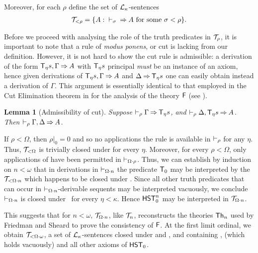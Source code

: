 \documentclass[UKenglish,cleveref,DIV=12]{scrartcl}
\newtheorem{lemma}{Lemma}[section]
\theoremstyle{definition}
\theoremstyle{definition}
\newcommand{\gelhighlight}[1]{\highlight[magenta]{#1}}
\begin{document}
Moreover, for each $\rho$ define the set of $\mathcal{L}_\kappa$-sentences
\begin{align*}
	\mathcal{T}_{<\rho}=\{ A:{}\vdash_\sigma  {} \mathbin\Rightarrow A\text{ for some $\sigma<\rho$}\}.
\end{align*}

Before we proceed with analysing the role of the truth predicates in
$\mathcal{T}_\rho$, it is important to note that a rule of \emph{modus ponens}, or cut
is lacking from our definition. However, it is not hard to show the cut rule is
admissible: a derivation of
the form $ \mathsf{T}_\eta s , \Gamma \mathbin\Rightarrow A $ with $ \mathsf{T}_\eta s$ principal \emph{must} be an
instance of an axiom, hence given derivations of $ \mathsf{T}_\eta s , \Gamma \mathbin\Rightarrow A $
and $\Delta \mathbin\Rightarrow \mathsf{T}_\eta s $ one can easily obtain instead a derivation of $\Gamma$.
This argument is essentially identical to that employed in the Cut Elimination
theorem in \cite{LeiRat10} for the analysis of the theory $\mathsf{F}$ (see \cite[Thm.~3.7]{LeiRat10}).
\begin{lemma}[Admissibility of cut]\label{thm:FFCutElim}
	Suppose $\vdash_\rho \Gamma \mathbin\Rightarrow \mathsf{T}_\eta s $, and $\vdash_\rho \Delta,
  \mathsf{T}_\eta s  \mathbin\Rightarrow A $. Then $\vdash_\rho \Gamma,\Delta \mathbin\Rightarrow A$.
\end{lemma}

If $\rho<\Omega$, then $\rho|_0=0$ and so no applications the rule \Nec\eta{} is available in $\vdash_\rho $ for any $\eta$. 
Thus, $\mathcal{T}_{\mathord<\Omega}$ is trivially closed under \Conec\eta{} for every $\eta$. \gelhighlight{Simple but not `trivial'}
Moreover, for every
$\rho<\Omega$, only applications of  have been permitted in $\vdash_{\Omega\cdot\rho}$. Thus, we can
establish by induction on $n<\omega$ that in derivations in $\vdash_{\Omega\cdot n}$ the predicate $\mathsf{T}_0$ may be interpreted by the $\mathcal{T}_{<\Omega\cdot n}$ which happens to be closed under .
Since all other truth predicates that can occur in $\vdash_{\Omega\cdot n}$-derivable sequents may be interpreted vacuously, we conclude $\vdash_{\Omega\cdot n}$ is closed under
\Conec\eta\ for every $\eta<\kappa$. 
Hence $\mathsf{HST}_0^n$ may be interpreted
in $\mathcal{T}_{\Omega\cdot n}$.

This suggests that for $n<\omega$, $\mathcal{T}_{\Omega\cdot n}$, like $\mathcal{T}_n$, reconstructs
the theories $\mathsf{Th}_n$ used by Friedman and Sheard to prove the consistency of
$\mathsf{F}$. At the first limit ordinal,
we obtain $\mathcal{T}_{<\Omega\cdot\omega}$, a set of $\mathcal{L}_\kappa$-sentences closed under
 and , and containing ,  (which holds vacuously) and all other axioms of $\mathsf{HST}_0$.
\end{document}
